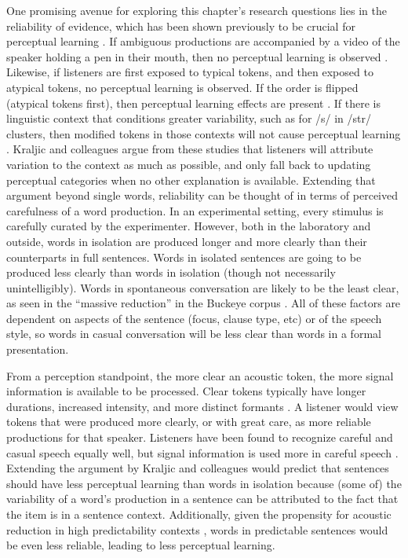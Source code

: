 One promising avenue for exploring this chapter's research questions lies in the reliability of evidence, which has been shown previously to be crucial for perceptual learning \citep{Kraljic2008, Kraljic2008a}.
If ambiguous productions are accompanied by a video of the speaker holding a pen in their mouth, then no perceptual learning is observed \citep{Kraljic2008}.
Likewise, if listeners are first exposed to typical tokens, and then exposed to atypical tokens, no perceptual learning is observed.
If the order is flipped (atypical tokens first), then perceptual learning effects are present \citep{Kraljic2008}.
If there is linguistic context that conditions greater variability, such as for /s/ in /str/ clusters, then modified tokens in those contexts will not cause perceptual learning \citep{Kraljic2008a}.
Kraljic and colleagues argue from these studies that listeners will attribute variation to the context as much as possible, and only fall back to updating perceptual categories when no other explanation is available.
Extending that argument beyond single words, reliability can be thought of in terms of perceived carefulness of a word production.
In an experimental setting, every stimulus is carefully curated by the experimenter.
However, both in the laboratory and outside, words in isolation are produced longer and more clearly than their counterparts in full sentences.
Words in isolated sentences are going to be produced less clearly than words in isolation (though not necessarily unintelligibly).
Words in spontaneous conversation are likely to be the least clear, as seen in the ``massive reduction'' in the Buckeye corpus \citep{Johnson2004, Dilts2013}.
All of these factors are dependent on aspects of the sentence (focus, clause type, etc) or of the speech style, so words in casual conversation will be less clear than words in a formal presentation.

From a perception standpoint, the more clear an acoustic token, the more signal information is available to be processed.
Clear tokens typically have longer durations, increased intensity, and more distinct formants \citep{Krause2004}.
A listener would view tokens that were produced more clearly, or with great care, as more reliable productions for that speaker.
Listeners have been found to recognize careful and casual speech equally well, but signal information is used more in careful speech \citep{Sumner2015}.
Extending the argument by Kraljic and colleagues would predict that sentences should have less perceptual learning than words in isolation because (some of) the variability of a word's production in a sentence can be attributed to the fact that the item is in a sentence context.
Additionally, given the propensity for acoustic reduction in high predictability contexts \citep{Scarborough2010}, words in predictable sentences would be even less reliable, leading to less perceptual learning.

